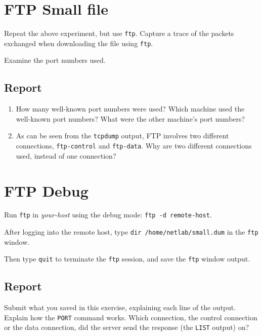 \documentclass{../UTNetLab}
\begin{document}
\section{FTP Small file}
	Repeat the above experiment, but use \lstinline{ftp}.
	Capture a trace of the packets exchanged when downloading the  file using \lstinline{ftp}.

	Examine the port numbers used.
	
    \subsection*{Report}
	\begin{enumerate}
		\item How many well-known port numbers were used?
		Which machine used the well-known port numbers?
		What were the other machine’s port numbers?
		
        \item As can be seen from the \lstinline{tcpdump} output, FTP involves two different connections, \texttt{ftp-control} and \texttt{ftp-data}.
		Why are two different connections used, instead of one connection?
	\end{enumerate}

\section{FTP Debug}
	Run \lstinline{ftp} in \textit{your-host} using the debug mode: \lstinline[emph={your-host, remote-host}]{ftp -d remote-host}.

	After logging into the remote host, type \lstinline{dir /home/netlab/small.dum} in the \lstinline{ftp} window.

	Then type \lstinline{quit} to terminate the \lstinline{ftp} session, and save the \lstinline{ftp} window output.
	
    \subsection*{Report}
	Submit what you saved in this exercise, explaining each line of the output.
	Explain how the \lstinline{PORT} command works.
	Which connection, the control connection or the data connection, did the server send the response (the \lstinline{LIST} output) on?
\end{document}
